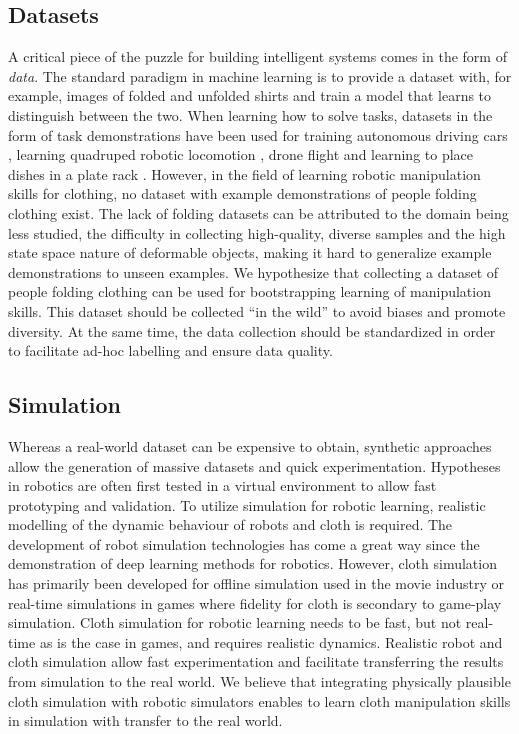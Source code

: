 \documentclass[\home/main.tex]{subfiles}
\begin{document}
\subsection{Datasets}
A critical piece of the puzzle for building intelligent systems comes in the form of \emph{data}. The standard paradigm in machine learning is to provide a dataset with, for example, images of folded and unfolded shirts and train a model that learns to distinguish between the two. When learning how to solve tasks, datasets in the form of task demonstrations have been used for training autonomous driving cars \autocite{bojarski2016end}, learning quadruped robotic locomotion \autocite{peng2020learning}, drone flight \autocite{Giusti2016} and learning to place dishes in a plate rack \autocite{Finn2016}. However, in the field of learning robotic manipulation skills for clothing, no dataset with example demonstrations of people folding clothing exist. The lack of folding datasets can be attributed to the domain being less studied, the difficulty in collecting high-quality, diverse samples and the high state space nature of deformable objects, making it hard to generalize example demonstrations to unseen examples. We hypothesize that collecting a dataset of people folding clothing can be used for bootstrapping learning of manipulation skills. This dataset should be collected \enquote{in the wild} to avoid biases and promote diversity. At the same time, the data collection should be standardized in order to facilitate ad-hoc labelling and ensure data quality.

\subsection{Simulation}
Whereas a real-world dataset can be expensive to obtain, synthetic approaches allow the generation of massive datasets and quick experimentation. Hypotheses in robotics are often first tested in a virtual environment to allow fast prototyping and validation. To utilize simulation for robotic learning, realistic modelling of the dynamic behaviour of robots and cloth is required. The development of robot simulation technologies has come a great way since the demonstration of deep learning methods for robotics. However, cloth simulation has primarily been developed for offline simulation used in the movie industry or real-time simulations in games where fidelity for cloth is secondary to game-play simulation. Cloth simulation for robotic learning needs to be fast, but not real-time as is the case in games, and requires realistic dynamics. Realistic robot and cloth simulation allow fast experimentation and facilitate transferring the results from simulation to the real world. We believe that integrating physically plausible cloth simulation with robotic simulators enables to learn cloth manipulation skills in simulation with transfer to the real world.
\end{document}
